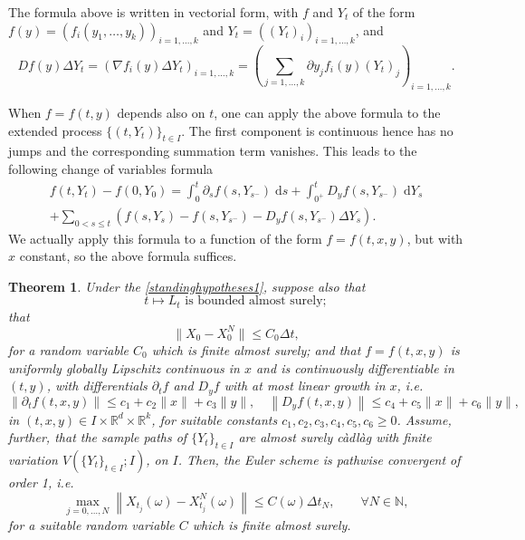 \documentclass[reqno,12pt]{amsart}
\theoremstyle{plain} %
\newtheorem{theorem}{Theorem}[section]
\theoremstyle{definition} %
\begin{document}
The formula above is written in vectorial form, with $f$ and $Y_t$ of the form $f(y)=(f_i(y_1, \ldots, y_k))_{i=1, \ldots, k}$ and $Y_t = ((Y_t)_i)_{i=1, \ldots, k}$, and
\[
    Df(y)\Delta Y_t = \left( \nabla f_i(y)\Delta Y_t\right)_{i=1, \ldots, k} = \left( \sum_{j=1, \ldots, k} \partial y_j f_i(y) (Y_t)_j \right)_{i=1, \ldots, k}.
\]

When $f=f(t, y)$ depends also on $t$, one can apply the above formula to the extended process $\{(t, Y_t)\}_{t\in I}$. The first component is continuous hence has no jumps and the corresponding summation term vanishes. This leads to the following change of variables formula
\begin{multline}
    \label{changeofvariablesformulacadlagfv}
    f(t, Y_t) - f(0, Y_0) = \int_0^t \partial_s f(s, Y_{s^-})\;\mathrm{d}s + \int_{0^+}^t D_y f(s, Y_{s^-}) \;\mathrm{d}Y_s \\
    + \sum_{0 < s \leq t} \left( f(s, Y_s) - f(s, Y_{s^{-}}) - D_y f(s, Y_{s^-})\Delta Y_s\right).
\end{multline}
We actually apply this formula to a function of the form $f=f(t, x, y)$, but with $x$ constant, so the above formula suffices.

\begin{theorem}
    \label{thmcadlagfv}
    Under the \cref{standinghypotheses1}, suppose also that
    \begin{equation}
        \label{Ltboundedas}
        t \mapsto L_t \textrm{ is bounded almost surely};
    \end{equation}
    that 
    \begin{equation}
        \label{X0conv}
        \|X_0 - X_0^N\| \leq C_0\Delta t,
    \end{equation}
    for a random variable $C_0$ which is finite almost surely; and that $f=f(t, x, y)$ is uniformly globally Lipschitz continuous in $x$ and is continuously differentiable in $(t, y)$, with differentials $\partial_t f$ and $D_y f$ with at most linear growth in $x$, i.e.
    \begin{equation}
        \label{ftfylineargrowthcadlagfv}
        \left\|\partial_t f(t, x, y)\right\| \leq c_1 + c_2 \|x\| + c_3\|y\|, \quad \left\|D_y f(t, x, y)\right\| \leq c_4 + c_5\|x\| + c_6\|y\|,
    \end{equation}
    in $(t, x, y)\in I\times \mathbb{R}^d\times \mathbb{R}^k$, for suitable constants $c_1, c_2, c_3, c_4, c_5, c_6 \geq 0$. Assume, further, that the sample paths of $\{Y_t\}_{t\in I}$ are almost surely c\`adl\`ag with finite variation $V(\{Y_t\}_{t\in I}; I)$, on $I$. Then, the Euler scheme is pathwise convergent of order 1, i.e.
    \begin{equation}
        \label{ordercadlagfv}
        \max_{j=0, \ldots, N} \left\| X_{t_j}(\omega) - X_{t_j}^N(\omega) \right\| \leq C(\omega) \Delta t_N, \qquad \forall N \in \mathbb{N},
    \end{equation}
    for a suitable random variable $C$ which is finite almost surely.
\end{theorem}
\end{document}
